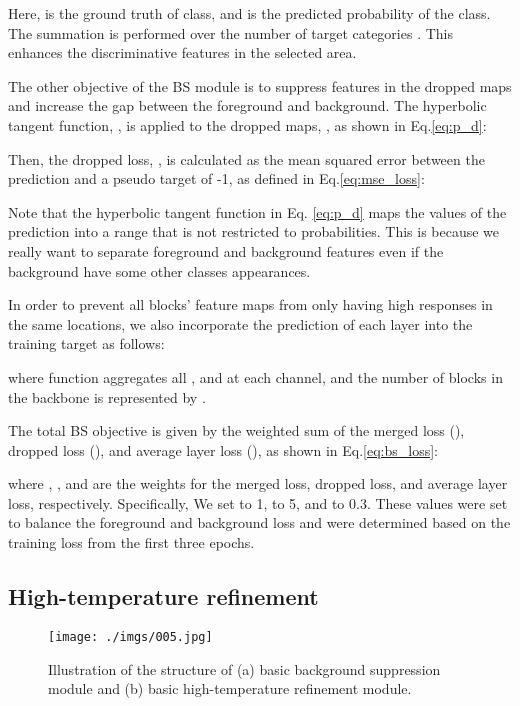 \documentclass[journal]{IEEEtran}
\begin{document}
Here,  is the ground truth of  class, and  is the predicted probability of the  class. The summation is performed over the number of target categories . This enhances the discriminative features in the selected area.  

The other objective of the BS module is to suppress features in the dropped maps and increase the gap between the foreground and background. The hyperbolic tangent function, , is applied to the dropped maps, , as shown in Eq.\eqref{eq:p_d}:


Then, the dropped loss, , is calculated as the mean squared error between the prediction and a pseudo target of -1, as defined in Eq.\eqref{eq:mse_loss}:


Note that the hyperbolic tangent function in Eq. \eqref{eq:p_d} maps the values of the prediction into a range that is not restricted to probabilities. This is because we really want to separate foreground and background features even if the background have some other classes appearances. 

In order to prevent all blocks' feature maps from only having high responses in the same locations, we also incorporate the prediction of each layer into the training target as follows:


where  function aggregates all , and  at each channel, and the number of blocks in the backbone is represented by .

The total BS objective is given by the weighted sum of the merged loss (), dropped loss (), and average layer loss (), as shown in Eq.\eqref{eq:bs_loss}:

where , , and  are the weights for the merged loss, dropped loss, and average layer loss, respectively. Specifically, We set  to 1,  to 5, and  to 0.3. These values were set to balance the foreground and background loss and were determined based on the training loss from the first three epochs.

\subsection{High-temperature refinement}

\begin{figure}[t]
    \begin{center}
    \texttt{[image: ./imgs/005.jpg]}
    \end{center} 
\caption{Illustration of the structure of (a) basic background suppression module and (b) basic high-temperature refinement module.}
\label{fig:basic_module}
\end{figure}
\end{document}
